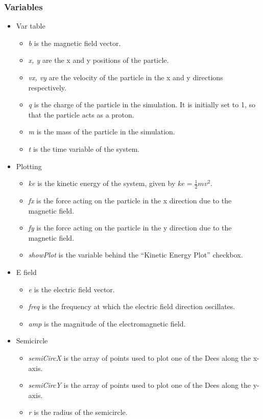 \subsubsection*{Variables}
\label{sec-1-3-1}
\begin{itemize}

\item Var table
\label{sec-1-3-1-1}%
\begin{itemize}
\item \emph{b} is the magnetic field vector.
\item \emph{x, y} are the x and y positions of the particle.
\item \emph{vx, vy} are the velocity of the particle in the x and y directions respectively.
\item \emph{q} is the charge of the particle in the simulation. It is initially
  set to 1, so that the particle acts as a proton.
\item \emph{m} is the mass of the particle in the simulation.
\item \emph{t} is the time variable of the system.
\end{itemize}

\item Plotting
\label{sec-1-3-1-2}%
\begin{itemize}
\item \emph{ke} is the kinetic energy of the system, given by $ke = \frac{1}{2}mv^2$.
\item \emph{fx} is the force acting on the particle in the x direction due to
  the magnetic field.
\item \emph{fy} is the force acting on the particle in the y direction due to
  the magnetic field.
\item \emph{showPlot} is the variable behind the ``Kinetic Energy Plot'' checkbox.
\end{itemize}


\item E field
\label{sec-1-3-1-3}%
\begin{itemize}
\item \emph{e} is the electric field vector.
\item \emph{freq} is the frequency at which the electric field direction oscillates.
\item \emph{amp} is the magnitude of the electromagnetic field.
\end{itemize}


\item Semicircle
\label{sec-1-3-1-4}%
\begin{itemize}
\item \emph{semiCircX} is the array of points used to plot one of the Dees
  along the x-axis.
\item \emph{semiCircY} is the array of points used to plot one of the Dees
  along the y-axis.
\item \emph{r} is the radius of the semicircle.
\end{itemize}

\end{itemize} %
